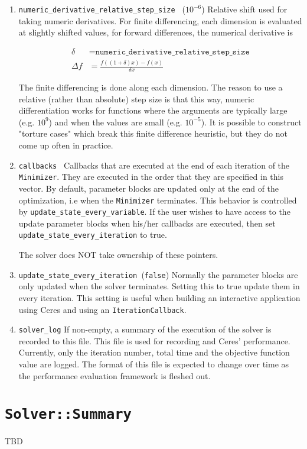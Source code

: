 \begin{enumerate}
\item{\texttt{numeric\_derivative\_relative\_step\_size }} ($10^{-6}$)
 Relative shift used for taking numeric derivatives. For finite
     differencing, each dimension is evaluated at slightly shifted
     values, \eg for forward differences, the numerical derivative is

\begin{align}
       \delta &= \texttt{numeric\_derivative\_relative\_step\_size}\\
       \Delta f &= \frac{f((1 + \delta)  x) - f(x)}{\delta x}
\end{align}


     The finite differencing is done along each dimension. The
     reason to use a relative (rather than absolute) step size is
     that this way, numeric differentiation works for functions where
     the arguments are typically large (e.g. $10^9$) and when the
     values are small (e.g. $10^{-5}$). It is possible to construct
     "torture cases" which break this finite difference heuristic,
     but they do not come up often in practice.

\item{\texttt{callbacks }}
  Callbacks that are executed at the end of each iteration of the
     \texttt{Minimizer}. They are executed in the order that they are
     specified in this vector. By default, parameter blocks are
     updated only at the end of the optimization, i.e when the
     \texttt{Minimizer} terminates. This behavior is controlled by
     \texttt{update\_state\_every\_variable}. If the user wishes to have access
     to the update parameter blocks when his/her callbacks are
     executed, then set \texttt{update\_state\_every\_iteration} to true.

     The solver does NOT take ownership of these pointers.

\item{\texttt{update\_state\_every\_iteration }}(\texttt{false})
Normally the parameter blocks are only updated when the solver
terminates. Setting this to true update them in every iteration. This
setting is useful when building an interactive application using Ceres
and using an \texttt{IterationCallback}.

\item{\texttt{solver\_log}}  If non-empty, a summary of the execution of the solver is
 recorded to this file.  This file is used for recording and Ceres'
 performance. Currently, only the iteration number, total
 time and the objective function value are logged. The format of this
 file is expected to change over time as the performance evaluation
 framework is fleshed out.
\end{enumerate}

\section{\texttt{Solver::Summary}}
TBD
